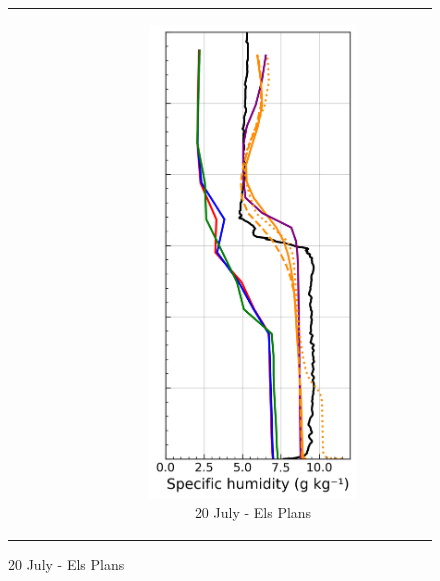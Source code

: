 \begin{figure}[hbtp]
{\begin{tabular}{@{}cccc@{}}
\begin{subfigure}[t]{0.285\textwidth}
        \end{subfigure} &
        \begin{subfigure}[t]{0.29\textwidth}
            \caption{20 July - Els Plans}
            \includegraphics[width=\textwidth]{images/chap6/profiles/profile_elsplans_ovap_2007_sensbins.png}

\end{subfigure}
\end{tabular}}
\end{figure}
